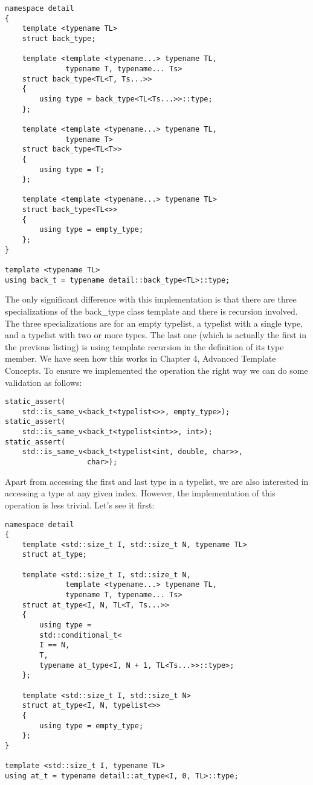 \begin{lstlisting}[style=styleCXX]
namespace detail
{
	template <typename TL>
	struct back_type;
	
	template <template <typename...> typename TL,
			  typename T, typename... Ts>
	struct back_type<TL<T, Ts...>>
	{
		using type = back_type<TL<Ts...>>::type;
	};

	template <template <typename...> typename TL,
	          typename T>
	struct back_type<TL<T>>
	{
		using type = T;
	};

	template <template <typename...> typename TL>
	struct back_type<TL<>>
	{
		using type = empty_type;
	};
}

template <typename TL>
using back_t = typename detail::back_type<TL>::type;
\end{lstlisting}

The only significant difference with this implementation is that there are three specializations of the back\_type class template and there is recursion involved. The three specializations are for an empty typelist, a typelist with a single type, and a typelist with two or more types. The last one (which is actually the first in the previous listing) is using template recursion in the definition of its type member. We have seen how this works in Chapter 4, Advanced Template Concepts. To ensure we implemented the operation the right way we can do some validation as follows:

\begin{lstlisting}[style=styleCXX]
static_assert(
	std::is_same_v<back_t<typelist<>>, empty_type>);
static_assert(
	std::is_same_v<back_t<typelist<int>>, int>);
static_assert(
	std::is_same_v<back_t<typelist<int, double, char>>,
				   char>);
\end{lstlisting}

Apart from accessing the first and last type in a typelist, we are also interested in accessing a type at any given index. However, the implementation of this operation is less trivial. Let’s see it first:

\begin{lstlisting}[style=styleCXX]
namespace detail
{
	template <std::size_t I, std::size_t N, typename TL>
	struct at_type;
	
	template <std::size_t I, std::size_t N,
			  template <typename...> typename TL,
			  typename T, typename... Ts>
	struct at_type<I, N, TL<T, Ts...>>
	{
		using type =
		std::conditional_t<
		I == N,
		T,
		typename at_type<I, N + 1, TL<Ts...>>::type>;
	};

	template <std::size_t I, std::size_t N>
	struct at_type<I, N, typelist<>>
	{
		using type = empty_type;
	};
}

template <std::size_t I, typename TL>
using at_t = typename detail::at_type<I, 0, TL>::type;
\end{lstlisting}


